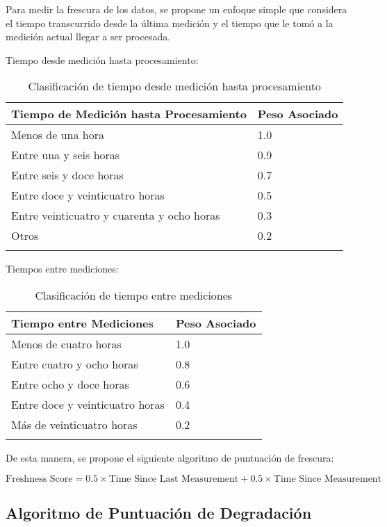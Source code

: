 Para medir la frescura de los datos, se propone un enfoque simple que considera el tiempo transcurrido desde la última medición 
y el tiempo que le tomó a la medición actual llegar a ser procesada.\newline

Tiempo desde medición hasta procesamiento:
\begin{longtable}{|p{9cm}|p{3cm}|}
    \hline
    \textbf{Tiempo de Medición hasta Procesamiento} & \textbf{Peso Asociado} \\
    \hline
    \endhead
    Menos de una hora & 1.0 \\
    \hline
    Entre una y seis horas & 0.9 \\
    \hline
    Entre seis y doce horas & 0.7 \\
    \hline
    Entre doce y veinticuatro horas & 0.5 \\
    \hline
    Entre veinticuatro y cuarenta y ocho horas & 0.3 \\
    \hline
    Otros & 0.2 \\
    \hline
    \caption{Clasificación de tiempo desde medición hasta procesamiento}
\end{longtable}

Tiempos entre mediciones:
\begin{longtable}{|p{9cm}|p{3cm}|}
    \hline
    \textbf{Tiempo entre Mediciones} & \textbf{Peso Asociado} \\
    \hline
    \endhead
    Menos de cuatro horas & 1.0 \\
    \hline
    Entre cuatro y ocho horas & 0.8 \\
    \hline
    Entre ocho y doce horas & 0.6 \\
    \hline
    Entre doce y veinticuatro horas & 0.4 \\
    \hline
    Más de veinticuatro horas & 0.2 \\
    \hline
    \caption{Clasificación de tiempo entre mediciones}
\end{longtable}

De esta manera, se propone el siguiente algoritmo de puntuación de frescura:

\begin{equation}
    \text{Freshness Score} = 0.5 \times \text{Time Since Last Measurement} + 0.5 \times \text{Time Since Measurement}
\end{equation}

\newpage

\subsection{Algoritmo de Puntuación de Degradación}

